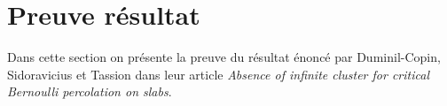\chapter{Preuve résultat}
	Dans cette section on présente la preuve du résultat énoncé par Duminil-Copin, Sidoravicius et Tassion dans leur article \emph{Absence of infinite cluster for critical Bernoulli percolation on slabs}.
	
	
	
	
	
	
	
\Tbreak
